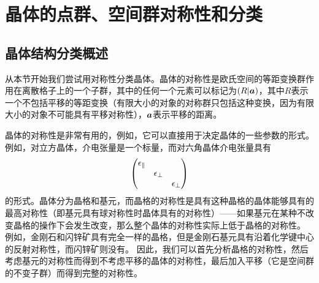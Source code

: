 \section{晶体的点群、空间群对称性和分类}

\subsection{晶体结构分类概述}\label{sec:crystal-structure-intro}

从本节开始我们尝试用对称性分类晶体。晶体的对称性是欧氏空间的等距变换群作用在离散格子上的一个子群，其中的任何一个元素可以标记为$(R|\vb*{a})$，其中$R$表示一个不包括平移的等距变换（有限大小的对象的对称群只包括这种变换，因为有限大小的对象不可能具有平移对称性），$\vb*{a}$表示平移的距离。

晶体的对称性是非常有用的，例如，它可以直接用于决定晶体的一些参数的形式。例如，对立方晶体，介电张量是一个标量，而对六角晶体介电张量具有
\[
    \pmqty{\dmat{\epsilon_\parallel, \epsilon_\bot, \epsilon_\bot}}
\]
的形式。晶体分为晶格和基元，而晶格的对称性是具有这种晶格的晶体能够具有的最高对称性（即基元具有球对称性时晶体具有的对称性）——如果基元在某种不改变晶格的操作下会发生改变，那么整个晶体的对称性实际上低于晶格的对称性。
例如，金刚石和闪锌矿具有完全一样的晶格，但是金刚石基元具有沿着化学键中心的反射对称性，而闪锌矿则没有。 %
因此，我们可以首先分析晶格的对称性，然后考虑基元的对称性而得到不考虑平移的晶体的对称性，最后加入平移（它是空间群的不变子群）而得到完整的对称性。

